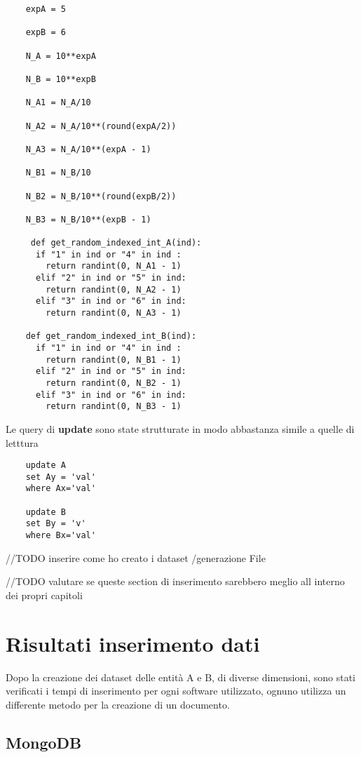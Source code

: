 \begin{verbatim}
    expA = 5

    expB = 6

    N_A = 10**expA 

    N_B = 10**expB

    N_A1 = N_A/10

    N_A2 = N_A/10**(round(expA/2))

    N_A3 = N_A/10**(expA - 1)

    N_B1 = N_B/10

    N_B2 = N_B/10**(round(expB/2))

    N_B3 = N_B/10**(expB - 1)

     def get_random_indexed_int_A(ind):
      if "1" in ind or "4" in ind :
        return randint(0, N_A1 - 1)
      elif "2" in ind or "5" in ind:
        return randint(0, N_A2 - 1)
      elif "3" in ind or "6" in ind:
        return randint(0, N_A3 - 1)

    def get_random_indexed_int_B(ind):
      if "1" in ind or "4" in ind :
        return randint(0, N_B1 - 1)
      elif "2" in ind or "5" in ind:
        return randint(0, N_B2 - 1)
      elif "3" in ind or "6" in ind:
        return randint(0, N_B3 - 1)   
\end{verbatim}

Le query di \textbf{update} sono state strutturate in modo abbastanza simile a quelle di letttura

\begin{verbatim}
    update A
    set Ay = 'val'
    where Ax='val'

    update B
    set By = 'v'
    where Bx='val'
\end{verbatim}

//TODO inserire come ho creato i dataset /generazione File 

//TODO valutare se queste section di inserimento sarebbero meglio all interno dei propri capitoli

\section{Risultati inserimento dati}

Dopo la creazione dei dataset delle entità A e B, di diverse dimensioni, sono stati verificati i tempi di inserimento per ogni software utilizzato, 
ognuno utilizza un differente metodo per la creazione di un documento.

\subsection{MongoDB}

